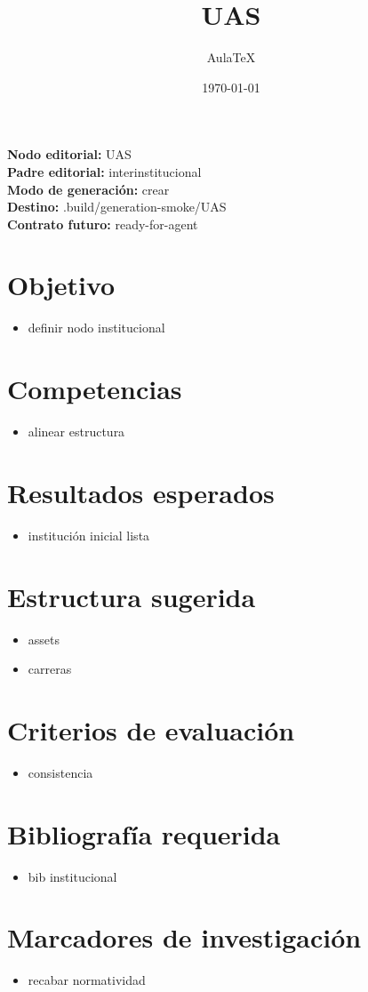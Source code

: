 \documentclass[12pt]{article}
\title{UAS}
\author{AulaTeX}
\date{\today}
\begin{document}
\maketitle

\noindent\textbf{Nodo editorial:} UAS\\
\textbf{Padre editorial:} interinstitucional\\
\textbf{Modo de generación:} crear\\
\textbf{Destino:} .build/generation-smoke/UAS\\
\textbf{Contrato futuro:} ready-for-agent

\section*{Objetivo}
\begin{itemize}[leftmargin=*]
  \item definir nodo institucional
\end{itemize}

\section*{Competencias}
\begin{itemize}[leftmargin=*]
  \item alinear estructura
\end{itemize}

\section*{Resultados esperados}
\begin{itemize}[leftmargin=*]
  \item institución inicial lista
\end{itemize}

\section*{Estructura sugerida}
\begin{itemize}[leftmargin=*]
  \item assets
  \item carreras
\end{itemize}

\section*{Criterios de evaluación}
\begin{itemize}[leftmargin=*]
  \item consistencia
\end{itemize}

\section*{Bibliografía requerida}
\begin{itemize}[leftmargin=*]
  \item bib institucional
\end{itemize}

\section*{Marcadores de investigación}
\begin{itemize}[leftmargin=*]
  \item recabar normatividad
\end{itemize}
\end{document}
